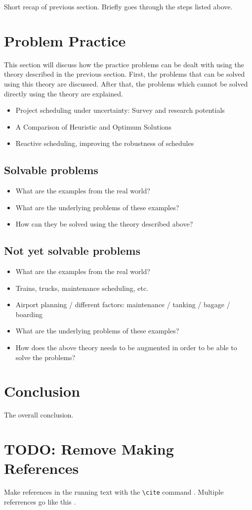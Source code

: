 \documentclass{article}
\newcommand{\TODO}[1]{{\color{red}\textbf{TODO: #1}}}
\begin{document}
Short recap of previous section. Briefly goes through the steps listed above.

\section{Problem Practice}
This section will discuss how the practice problems can be dealt with using the theory described in the previous section. First, the problems that can be solved using this theory are discussed. After that, the problems which cannot be solved directly using the theory are explained.\\

\begin{itemize}
\item Project scheduling under uncertainty: Survey
and research potentials
\item A Comparison of Heuristic and Optimum Solutions
\item Reactive scheduling, improving the robustness of schedules
\end{itemize}

\subsection{Solvable problems}
\begin{itemize}
\item What are the examples from the real world?
\item What are the underlying problems of these examples?
\item How can they be solved using the theory described above?
\end{itemize}

\subsection{Not yet solvable problems}
\begin{itemize}
\item What are the examples from the real world?
\item Trains, trucks, maintenance scheduling, etc.
\item Airport planning / different factors: maintenance / tanking / bagage / boarding
\item What are the underlying problems of these examples?
\item How does the above theory needs to be augmented in order to be able to solve the problems?
\end{itemize}

\section{Conclusion}

The overall conclusion.


\section{\TODO{Remove} Making References}

  Make references in the running text with the \verb+\cite+
  command \cite{dijkstra68}. Multiple referrences go like this
  \cite{charniak85,steels98}.




\end{document}

